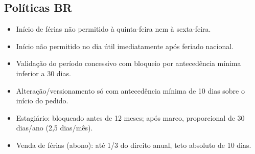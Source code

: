 \documentclass[11pt,a4paper,twoside]{article}
\begin{document}
\subsection{Políticas BR}
\begin{itemize}
  \item Início de férias não permitido à quinta-feira nem à sexta-feira.
  \item Início não permitido no dia útil imediatamente após feriado nacional.
  \item Validação do período concessivo com bloqueio por antecedência mínima inferior a 30 dias.
  \item Alteração/versionamento só com antecedência mínima de 10 dias sobre o início do pedido.
  \item Estagiário: bloqueado antes de 12 meses; após marco, proporcional de 30 dias/ano (2,5 dias/mês).
  \item Venda de férias (abono): até 1/3 do direito anual, teto absoluto de 10 dias.
\end{itemize}
\end{document}
